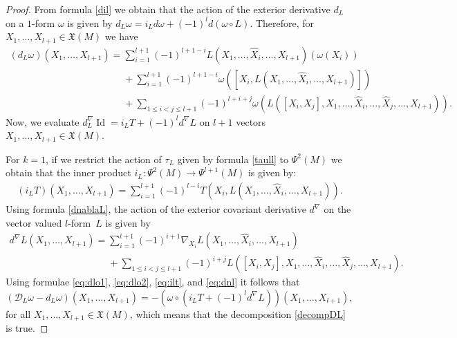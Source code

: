 \begin{proof}
From formula \eqref{dil} we obtain that the action of the exterior
derivative $d_L$ on a $1$-form $\omega$ is given by
$d_L\omega=i_Ld\omega+ (-1)^ld(\omega\circ L)$.
Therefore, for $X_1, \dots , X_{l+1} \in {\mathfrak X}(M)$ we have{\samepage
\begin{gather}
\nonumber (d_L\omega)(X_1,\dots ,X_{l+1})   =   \sum_{i=1}^{l+1}(-1)^{l+1-i}
L(X_1,\dots , \hat{X}_i,\dots , X_{l+1})(\omega(X_i))  \\
\label{eq:dlo2}
\phantom{(d_L\omega)(X_1,\dots ,X_{l+1})   =}{}
+\sum_{i=1}^{l+1}(-1)^{l+1-i} \omega([X_i, L(X_1,\dots ,
\hat{X}_i,\dots , X_{l+1})])  \\
\nonumber   \phantom{(d_L\omega)(X_1,\dots ,X_{l+1})   =}{}
 +\sum_{1\leq i<j\leq l+1}
(-1)^{l+i+j}\omega(L([X_i,X_j], X_1,\dots , \hat{X}_i,\dots ,
\hat{X}_j,\dots , X_{l+1})).
\end{gather}
Now, we evaluate $d^{\nabla}_L\operatorname{Id}=i_LT + (-1)^l
d^{\nabla}L$ on $l+1$ vectors $X_1, \dots , X_{l+1} \in {\mathfrak
X}(M)$.}

For $k=1$, if we restrict the action of $\tau_L$ given by formula
\eqref{taull} to $\Psi^2(M)$ we obtain that the inner product $i_L: \Psi^2(M) \to
\Psi^{l+1}(M)$ is given by:
\begin{gather}
\left(i_LT\right)(X_1,\dots ,
X_{l+1})=\sum_{i=1}^{l+1}(-1)^{l-i}T(X_i, L(X_1,\dots , \hat{X}_i,
\dots , X_{l+1})). \label{eq:ilt}
\end{gather} Using formula \eqref{dnablaL}, the action of the exterior covariant derivative
$d^{\nabla}$ on the vector valued
$l$-form~$L$ is given by
\begin{gather}
\nonumber   d^{\nabla}L(X_1,\dots , X_{l+1}) = \sum_{i=1}^{l+1}
(-1)^{i+1}\nabla_{X_i}L(X_1,\dots , \hat{X}_i, \dots , X_{l+1})  \\
\phantom{d^{\nabla}L(X_1,\dots , X_{l+1}) =}{}
 + \sum_{1\leq i<j\leq l+1} (-1)^{i+j}L([X_i, X_j], X_1,\dots ,
\hat{X}_i,\dots , \hat{X}_j,\dots , X_{l+1}). \label{eq:dnl}
\end{gather}
Using formulae \eqref{eq:dlo1}, \eqref{eq:dlo2}, \eqref{eq:ilt}, and \eqref{eq:dnl} it follows that
\[
\left({\mathcal D}_L \omega-d_L\omega\right)(X_1,\dots ,X_{l+1}) =
-\left(\omega\circ (i_LT+(-1)^ld^{\nabla}L)\right)(X_1,\dots ,X_{l+1}),
\]
for all $X_1,\dots , X_{l+1}\in  {\mathfrak X}(M)$, which means that the decomposition \eqref{decompDL} is true.
\end{proof}

